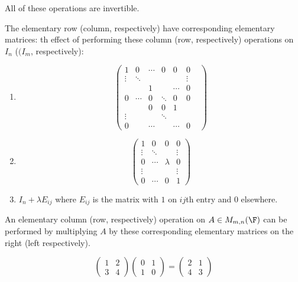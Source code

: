 \documentclass[a4paper]{article}
\theoremstyle{definition}
\begin{document}
\begin{note}
  All of these operations are invertible.
\end{note}

\begin{defi}
The elementary row (column, respectively) have corresponding elementary matrices: th effect of performing these column (row, respectively) operations on \(I_n\) (\((I_m\), respectively):
\begin{enumerate}
\item
  \[
    \begin{pmatrix}
      1 & 0 & \cdots & 0 & 0 & 0\\
      \vdots & \ddots & & & & \vdots\\
      & & 1 & & \cdots & 0\\
      0 & \cdots & 0 & \ddots & 0 & 0 \\
      & & 0 & 0 & 1 & &\\
      \vdots & && \ddots& &\\
      0 & & \cdots & & \cdots & 0
    \end{pmatrix}
  \]
\item
  \[
    \begin{pmatrix}
      1 & 0 & 0 & 0 \\
      \vdots & \ddots & & \vdots \\
      0 & \cdots & \lambda & 0 \\
      \vdots & & & \vdots \\
      0 & \cdots & 0 & 1
    \end{pmatrix}
  \]
\item \(I_n+\lambda E_{ij}\) where \(E_{ij}\) is the matrix with \(1\) on \(ij\)th entry and \(0\) elsewhere.
\end{enumerate}
\end{defi}

An elementary column (row, respectively) operation on \(A\in M_{m,n}(\F)\) can be performed by multiplying \(A\) by these corresponding elementary matrices on the right (left respectively).

\begin{eg}
  \[
    \begin{pmatrix}
      1 & 2 \\ 3 & 4
    \end{pmatrix}
    \begin{pmatrix} 0 & 1 \\ 1 & 0 \end{pmatrix} = \begin{pmatrix} 2 & 1 \\ 4 & 3 \end{pmatrix}
  \]
\end{eg}
\end{document}
